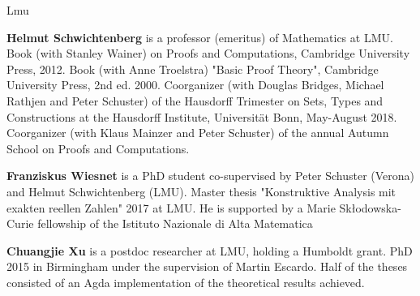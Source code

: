 \begin{sitedescription}{Lmu}
\begin{compactitem}
\item \textbf{Helmut Schwichtenberg} is a professor (emeritus) of
  Mathematics at LMU.  Book (with Stanley Wainer) on Proofs and
  Computations, Cambridge University Press, 2012.  Book (with Anne
  Troelstra) "Basic Proof Theory", Cambridge University Press, 2nd
  ed. 2000.  Coorganizer (with Douglas Bridges, Michael Rathjen and
  Peter Schuster) of the Hausdorff Trimester on Sets, Types and
  Constructions at the Hausdorff Institute, Universit\"at Bonn,
  May-August 2018.  Coorganizer (with Klaus Mainzer and Peter
  Schuster) of the annual Autumn School on Proofs and Computations.

\item \textbf{Franziskus Wiesnet} is a PhD student co-supervised by
  Peter Schuster (Verona) and Helmut Schwichtenberg (LMU).  Master
  thesis "Konstruktive Analysis mit exakten reellen Zahlen" 2017 at
  LMU.  He is supported by a Marie Sk{\l}odowska-Curie fellowship of
  the Istituto Nazionale di Alta Matematica

\item \textbf{Chuangjie Xu} is a postdoc researcher at LMU, holding a
  Humboldt grant.  PhD 2015 in Birmingham under the supervision of
  Martin Escardo.  Half of the theses consisted of an Agda
  implementation of the theoretical results achieved.

\end{compactitem}



\end{sitedescription}

